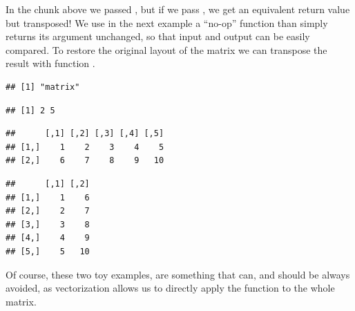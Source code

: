 \documentclass[krantz2]{krantz}\usepackage{knitr}%
\begin{document}
\begin{warningbox}
In the chunk above we passed , but if we pass , we get an equivalent return value but transposed! We use in the next example a ``no-op'' function than simply returns its argument unchanged, so that input and output can be easily compared. To restore the original layout of the matrix we can transpose the result with function .

\begin{knitrout}\footnotesize
{}\color{fgcolor}\begin{kframe}
\begin{alltt}
 \hlkwb{<-} \hlstd{(}   \hlstd{=} \hlstd{,}  
\end{alltt}
\begin{verbatim}
## [1] "matrix"
\end{verbatim}
\begin{alltt}
\end{alltt}
\begin{verbatim}
## [1] 2 5
\end{verbatim}
\begin{alltt}
\end{alltt}
\begin{verbatim}
##      [,1] [,2] [,3] [,4] [,5]
## [1,]    1    2    3    4    5
## [2,]    6    7    8    9   10
\end{verbatim}
\begin{alltt}
\end{alltt}
\begin{verbatim}
##      [,1] [,2]
## [1,]    1    6
## [2,]    2    7
## [3,]    3    8
## [4,]    4    9
## [5,]    5   10
\end{verbatim}
\end{kframe}
\end{knitrout}

Of course, these two toy examples, are something that can, and should be always avoided, as vectorization allows us to directly apply the function to the whole matrix.

\begin{knitrout}\footnotesize
{}\color{fgcolor}\begin{kframe}
\begin{alltt}
 \hlkwb{<-} 
\end{alltt}
\end{kframe}
\end{knitrout}


\end{warningbox}
\end{document}
